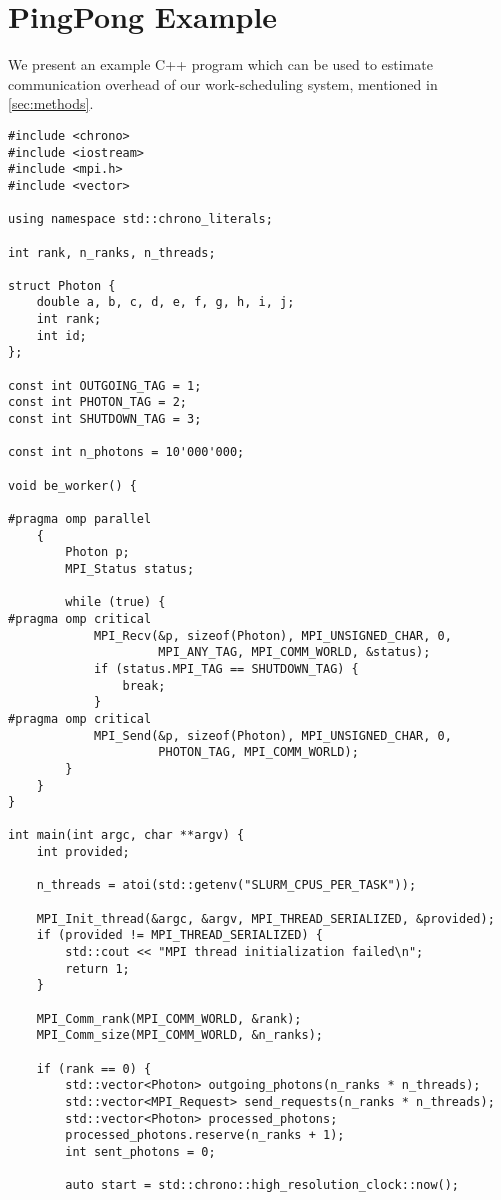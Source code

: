 \section{PingPong Example}
\label{appendix:pingpong}
We present an example C++ program which can be used to estimate communication overhead of our work-scheduling system, mentioned in \ref{sec:methods}.

\begin{lstlisting}
#include <chrono>
#include <iostream>
#include <mpi.h>
#include <vector>

using namespace std::chrono_literals;

int rank, n_ranks, n_threads;

struct Photon {
    double a, b, c, d, e, f, g, h, i, j;
    int rank;
    int id;
};

const int OUTGOING_TAG = 1;
const int PHOTON_TAG = 2;
const int SHUTDOWN_TAG = 3;

const int n_photons = 10'000'000;

void be_worker() {

#pragma omp parallel
    {
        Photon p;
        MPI_Status status;

        while (true) {
#pragma omp critical
            MPI_Recv(&p, sizeof(Photon), MPI_UNSIGNED_CHAR, 0,
                     MPI_ANY_TAG, MPI_COMM_WORLD, &status);
            if (status.MPI_TAG == SHUTDOWN_TAG) {
                break;
            }
#pragma omp critical
            MPI_Send(&p, sizeof(Photon), MPI_UNSIGNED_CHAR, 0,
                     PHOTON_TAG, MPI_COMM_WORLD);
        }
    }
}

int main(int argc, char **argv) {
    int provided;

    n_threads = atoi(std::getenv("SLURM_CPUS_PER_TASK"));

    MPI_Init_thread(&argc, &argv, MPI_THREAD_SERIALIZED, &provided);
    if (provided != MPI_THREAD_SERIALIZED) {
        std::cout << "MPI thread initialization failed\n";
        return 1;
    }

    MPI_Comm_rank(MPI_COMM_WORLD, &rank);
    MPI_Comm_size(MPI_COMM_WORLD, &n_ranks);

    if (rank == 0) {
        std::vector<Photon> outgoing_photons(n_ranks * n_threads);
        std::vector<MPI_Request> send_requests(n_ranks * n_threads);
        std::vector<Photon> processed_photons;
        processed_photons.reserve(n_ranks + 1);
        int sent_photons = 0;

        auto start = std::chrono::high_resolution_clock::now();


\end{lstlisting}
